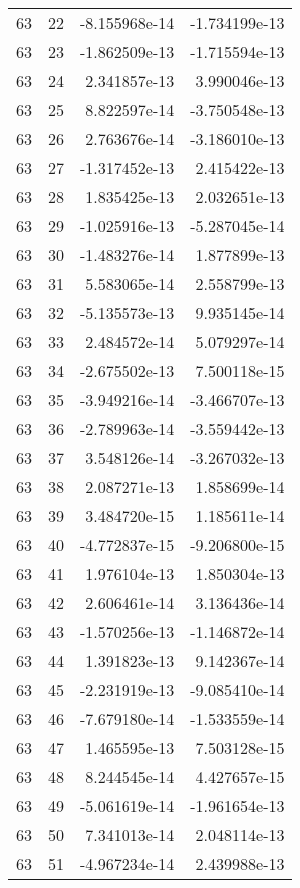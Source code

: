 \begin{tabular}{rrrr}
  63 &   22 & -8.155968e-14 & -1.734199e-13 \\
  63 &   23 & -1.862509e-13 & -1.715594e-13 \\
  63 &   24 &  2.341857e-13 &  3.990046e-13 \\
  63 &   25 &  8.822597e-14 & -3.750548e-13 \\
  63 &   26 &  2.763676e-14 & -3.186010e-13 \\
  63 &   27 & -1.317452e-13 &  2.415422e-13 \\
  63 &   28 &  1.835425e-13 &  2.032651e-13 \\
  63 &   29 & -1.025916e-13 & -5.287045e-14 \\
  63 &   30 & -1.483276e-14 &  1.877899e-13 \\
  63 &   31 &  5.583065e-14 &  2.558799e-13 \\
  63 &   32 & -5.135573e-13 &  9.935145e-14 \\
  63 &   33 &  2.484572e-14 &  5.079297e-14 \\
  63 &   34 & -2.675502e-13 &  7.500118e-15 \\
  63 &   35 & -3.949216e-14 & -3.466707e-13 \\
  63 &   36 & -2.789963e-14 & -3.559442e-13 \\
  63 &   37 &  3.548126e-14 & -3.267032e-13 \\
  63 &   38 &  2.087271e-13 &  1.858699e-14 \\
  63 &   39 &  3.484720e-15 &  1.185611e-14 \\
  63 &   40 & -4.772837e-15 & -9.206800e-15 \\
  63 &   41 &  1.976104e-13 &  1.850304e-13 \\
  63 &   42 &  2.606461e-14 &  3.136436e-14 \\
  63 &   43 & -1.570256e-13 & -1.146872e-14 \\
  63 &   44 &  1.391823e-13 &  9.142367e-14 \\
  63 &   45 & -2.231919e-13 & -9.085410e-14 \\
  63 &   46 & -7.679180e-14 & -1.533559e-14 \\
  63 &   47 &  1.465595e-13 &  7.503128e-15 \\
  63 &   48 &  8.244545e-14 &  4.427657e-15 \\
  63 &   49 & -5.061619e-14 & -1.961654e-13 \\
  63 &   50 &  7.341013e-14 &  2.048114e-13 \\
  63 &   51 & -4.967234e-14 &  2.439988e-13 \\

\end{tabular}
